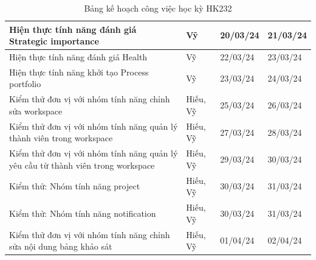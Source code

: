 \begin{table}[H]
{\begin{tabular}{|p{11cm}|p{1.75cm}|p{1.5cm}|p{1.5cm}|}
        Hiện thực tính năng đánh giá Strategic importance & Vỹ & 20/03/24 & 21/03/24 \\ \hline
        Hiện thực tính năng đánh giá Health & Vỹ & 22/03/24 & 23/03/24 \\ \hline
        Hiện thực tính năng khởi tạo Process portfolio & Vỹ & 23/03/24 & 24/03/24 \\ \hline
        Kiểm thử đơn vị với nhóm tính năng chỉnh sửa workspace & Hiếu, Vỹ & 25/03/24 & 26/03/24 \\ \hline
        Kiểm thử đơn vị với nhóm tính năng quản lý thành viên trong workspace & Hiếu, Vỹ & 27/03/24 & 28/03/24 \\ \hline
        Kiểm thử đơn vị với nhóm tính năng quản lý yêu cầu từ thành viên trong workspace & Hiếu, Vỹ & 29/03/24 & 30/03/24 \\ \hline
        Kiểm thử: Nhóm tính năng project & Hiếu, Vỹ & 30/03/24 & 31/03/24 \\ \hline
        Kiểm thử: Nhóm tính năng notification & Hiếu, Vỹ & 30/03/24 & 31/03/24 \\ \hline
        Kiểm thử đơn vị với nhóm tính năng chỉnh sửa nội dung bảng khảo sát & Hiếu, Vỹ & 01/04/24 & 02/04/24 \\ \hline
    \end{tabular}%
    }
    \caption{Bảng kế hoạch công việc học kỳ HK232}
\end{table}

\begin{table}[H]
    \centering
    \def\arraystretch{2}
    \caption{Bảng kế hoạch công việc học kỳ HK232 - tiếp theo}
\end{table}